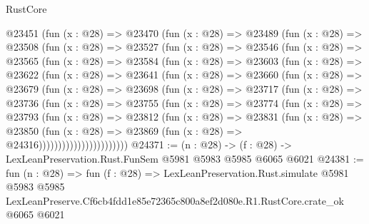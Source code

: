 \begin{lexlean}{RustCore}
\begin{coremodule}
  @23451
    (fun (x : @28) =>
    @23470
      (fun (x : @28) =>
      @23489
        (fun (x : @28) =>
        @23508
          (fun (x : @28) =>
          @23527
            (fun (x : @28) =>
            @23546
              (fun (x : @28) =>
              @23565
                (fun (x : @28) =>
                @23584
                  (fun (x : @28) =>
                  @23603
                    (fun (x : @28) =>
                    @23622
                      (fun (x : @28) =>
                      @23641
                        (fun (x : @28) =>
                        @23660
                          (fun (x : @28) =>
                          @23679
                            (fun (x : @28) =>
                            @23698
                              (fun (x : @28) =>
                              @23717
                                (fun (x : @28) =>
                                @23736
                                  (fun (x : @28) =>
                                  @23755
                                    (fun (x : @28) =>
                                    @23774
                                      (fun (x : @28) =>
                                      @23793
                                        (fun (x : @28) =>
                                        @23812
                                          (fun (x : @28) =>
                                          @23831
                                            (fun (x : @28) =>
                                            @23850
                                              (fun (x : @28) =>
                                              @23869 (fun (x : @28) => @24316)))))))))))))))))))))))
@24371 := (n : @28) -> (f : @28) -> LexLeanPreservation.Rust.FunSem @5981 @5983 @5985 @6065 @6021
@24381 := fun (n : @28) =>
  fun (f : @28) =>
  LexLeanPreservation.Rust.simulate
    @5981
    @5983
    @5985
    LexLeanPreserve.Cf6cb4fdd1e85e72365c800a8ef2d080e.R1.RustCore.crate_ok
    @6065
    @6021
\end{coremodule}
\end{lexlean}
